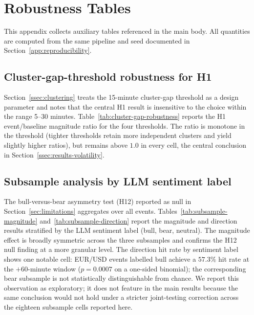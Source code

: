 \section{Robustness Tables}
\label{app:online}

This appendix collects auxiliary tables referenced in the main body.
All quantities are computed from the same pipeline and seed
documented in Section~\ref{app:reproducibility}.

\subsection{Cluster-gap-threshold robustness for H1}
\label{app:cluster-gap}

Section~\ref{ssec:clustering} treats the 15-minute cluster-gap
threshold as a design parameter and notes that the central H1 result
is insensitive to the choice within the range 5--30 minutes.
Table~\ref{tab:cluster-gap-robustness} reports the H1 event/baseline
magnitude ratio for the four thresholds. The ratio is monotone in
the threshold (tighter thresholds retain more independent clusters
and yield slightly higher ratios), but remains above $1.0$ in every
cell, the central conclusion in Section~\ref{ssec:results-volatility}.



\subsection{Subsample analysis by LLM sentiment label}
\label{app:subsample}

The bull-versus-bear asymmetry test (H12) reported as null in
Section~\ref{sec:limitations} aggregates over all events.
Tables~\ref{tab:subsample-magnitude} and~\ref{tab:subsample-direction}
report the magnitude and direction results stratified by the LLM
sentiment label (bull, bear, neutral). The magnitude effect is
broadly symmetric across the three subsamples and confirms the H12
null finding at a more granular level. The direction hit rate by
sentiment label shows one notable cell: EUR/USD events labelled
bull achieve a $57.3\%$ hit rate at the $+60$-minute window
($p = 0.0007$ on a one-sided binomial); the corresponding bear
subsample is not statistically distinguishable from chance. We
report this observation as exploratory; it does not feature in the
main results because the same conclusion would not hold under a
stricter joint-testing correction across the eighteen subsample
cells reported here.


